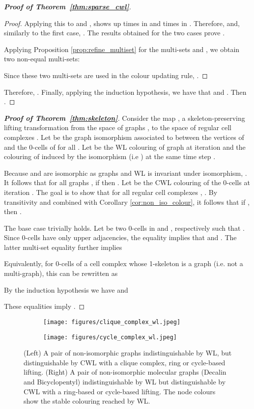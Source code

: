 \documentclass{article}
\begin{document}
\begin{proof}[\textbf{Proof of Theorem~\ref{thm:sparse_cwl}}]
\begin{proof}
Applying this to  and ,  shows up  times in  and  times in . Therefore,  and, similarly to the first case, . The results obtained for the two cases prove .

Applying Proposition \ref{prop:refine_multiset} for the multi-sets  and , we obtain two non-equal multi-sets:

Since these two multi-sets are used in the colour updating rule, . 
\end{proof}

Therefore, . Finally, applying the induction hypothesis, we have that  and  . Then . 
\end{proof}

\begin{proof}[\textbf{Proof of Theorem~\ref{thm:skeleton}}]
Consider the map , a skeleton-preserving lifting transformation from the space of graphs , to the space of regular cell complexes . Let  be the graph isomorphism associated to  between the vertices of  and the 0-cells of  for all . Let  be the WL colouring of graph  at iteration  and  the colouring of  induced by the isomorphism  (i.e ) at the same time step . 

Because  and  are isomorphic as graphs and WL is invariant under isomorphism, . It follows that for all graphs , if  then . Let  be the CWL colouring of the 0-cells at iteration . The goal is to show that for all regular cell complexes , . By transitivity and combined with Corollary \ref{cor:non_iso_colour}, it follows that if , then . 

The base case trivially holds. Let  be two 0-cells in  and , respectively such that . Since 0-cells have only upper adjacencies, the equality implies that  and . The latter multi-set equality further implies

Equivalently, for 0-cells of a cell complex whose 1-skeleton is a graph (i.e. not a multi-graph), this can be rewritten as

By the induction hypothesis we have  and

These equalities imply .
\end{proof}

\begin{figure}[t]
    \centering
    \begin{subfigure}{0.44\textwidth}
        \centering
        \texttt{[image: figures/clique\_complex\_wl.jpeg]}
    \end{subfigure}
    \hfill
    \begin{subfigure}{0.5\textwidth}
        \centering
        \texttt{[image: figures/cycle\_complex\_wl.jpeg]}
    \end{subfigure}
    \caption{(Left) A pair of non-isomorphic graphs indistinguishable by WL, but distinguishable by CWL with a clique complex, ring or cycle-based lifting. (Right) A pair of non-isomorphic molecular graphs (Decalin and Bicyclopentyl) indistinguishable by WL but distinguishable by CWL with a ring-based or cycle-based lifting. The node colours show the stable colouring reached by WL. }
    \label{fig:wl_corollary}
\end{figure}
\end{document}
